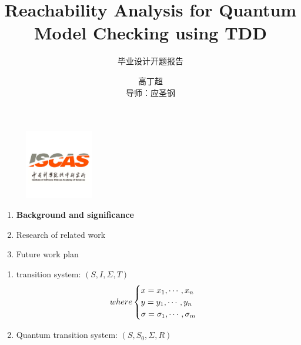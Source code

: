\documentclass[aspectratio=1610,18pt]{ctexbeamer}
\title[TDD in quantum]{Reachability Analysis for Quantum Model Checking using TDD}
\subtitle{毕业设计开题报告}
\author{高丁超\\导师：应圣钢}
\begin{document}
\begin{frame}[plain]
  \titlepage
  \begin{figure}
    \centering
    \begin{minipage}[t]{0.48\textwidth}
    \centering
    \includegraphics[width=3cm]{iscas.png}
    \end{minipage}
  \end{figure}
\end{frame}
\begin{frame}
  \centering
  \begin{enumerate}

    \Large
    \item \textbf{Background and significance}
    \item Research of related work
    \item Future work plan
  \end{enumerate}
\end{frame}
\begin{frame}
  \begin{enumerate}
    \Large
    \item  transition system: $(S, I, \Sigma, T)$
    \begin{equation}
      where
      \begin{cases}
        x = x_1, \cdots, x_n\\
        y = y_1, \cdots, y_n\\
        \sigma = \sigma_1, \cdots, \sigma_m
      \end{cases}
      \notag
    \end{equation}
    \item Quantum transition system: $(S, S_0, \Sigma, R)$
  \end{enumerate}
\end{frame}
\end{document}
